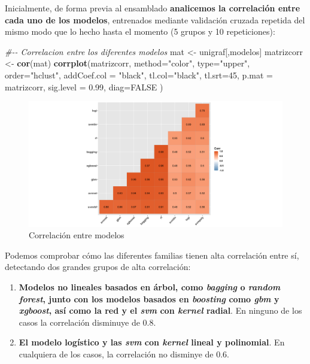 \documentclass[
]{article}
\newenvironment{Shaded}{\begin{snugshade}}{\end{snugshade}}
\newcommand{\CommentTok}[1]{\textcolor[rgb]{0.56,0.35,0.01}{\textit{#1}}}
\newcommand{\DataTypeTok}[1]{\textcolor[rgb]{0.13,0.29,0.53}{#1}}
\newcommand{\DecValTok}[1]{\textcolor[rgb]{0.00,0.00,0.81}{#1}}
\newcommand{\FloatTok}[1]{\textcolor[rgb]{0.00,0.00,0.81}{#1}}
\newcommand{\KeywordTok}[1]{\textcolor[rgb]{0.13,0.29,0.53}{\textbf{#1}}}
\newcommand{\NormalTok}[1]{#1}
\newcommand{\OtherTok}[1]{\textcolor[rgb]{0.56,0.35,0.01}{#1}}
\newcommand{\StringTok}[1]{\textcolor[rgb]{0.31,0.60,0.02}{#1}}
\begin{document}
Inicialmente, de forma previa al ensamblado \textbf{analicemos la
correlación entre cada uno de los modelos}, entrenados mediante
validación cruzada repetida del mismo modo que lo hecho hasta el momento
(5 grupos y 10 repeticiones):

\begin{Shaded}
\begin{Highlighting}[]
\CommentTok{\#{-}{-} Correlacion entre los diferentes modelos}
\NormalTok{mat <{-}}\StringTok{ }\NormalTok{unigraf[,modelos] }
\NormalTok{matrizcorr <{-}}\StringTok{ }\KeywordTok{cor}\NormalTok{(mat)}
\KeywordTok{corrplot}\NormalTok{(matrizcorr, }\DataTypeTok{method=}\StringTok{"color"}\NormalTok{,}
         \DataTypeTok{type=}\StringTok{"upper"}\NormalTok{, }\DataTypeTok{order=}\StringTok{"hclust"}\NormalTok{, }
         \DataTypeTok{addCoef.col =} \StringTok{"black"}\NormalTok{,}
         \DataTypeTok{tl.col=}\StringTok{"black"}\NormalTok{, }\DataTypeTok{tl.srt=}\DecValTok{45}\NormalTok{,}
         \DataTypeTok{p.mat =}\NormalTok{ matrizcorr, }\DataTypeTok{sig.level =} \FloatTok{0.99}\NormalTok{,}
         \DataTypeTok{diag=}\OtherTok{FALSE}
\NormalTok{)}
\end{Highlighting}
\end{Shaded}

\begin{figure}[h!]

{\centering \includegraphics[width=1\linewidth,height=1\textheight,]{./charts/ensamb_corr} 

}

\caption{Correlación entre modelos}\label{fig:unnamed-chunk-140}
\end{figure}

Podemos comprobar cómo las diferentes familias tienen alta correlación
entre sí, detectando dos grandes grupos de alta correlación:

\begin{enumerate}
\def\labelenumi{\arabic{enumi}.}
\item
  \textbf{Modelos no lineales basados en árbol, como \emph{bagging} o
  \emph{random forest}, junto con los modelos basados en \emph{boosting}
  como \emph{gbm} y \emph{xgboost}, así como la red y el \emph{svm} con
  \emph{kernel} radial}. En ninguno de los casos la correlación
  disminuye de 0.8.
\item
  \textbf{El modelo logístico y las \emph{svm} con \emph{kernel} lineal
  y polinomial}. En cualquiera de los casos, la correlación no disminye
  de 0.6.
\end{enumerate}
\end{document}
